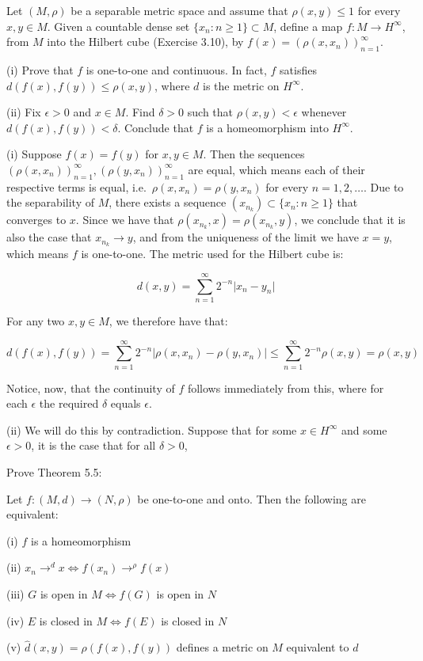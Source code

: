 \begin{exercise}{51}
    Let $(M, \rho)$ be a separable metric space and assume that $\rho(x, y) \leq 1$ for every $x, y \in M$.
    Given a countable dense set $\{x_n: n \geq 1\} \subset M$, define a map $f: M \rightarrow H^{\infty}$, from $M$ into the Hilbert cube (Exercise 3.10), by $f(x) = (\rho(x, x_n))_{n=1}^{\infty}$.

    (i) Prove that $f$ is one-to-one and continuous.
    In fact, $f$ satisfies $d(f(x), f(y)) \leq \rho(x, y)$, where $d$ is the metric on $H^{\infty}$.

    (ii) Fix $\epsilon > 0$ and $x \in M$.
    Find $\delta > 0$ such that $\rho(x, y) < \epsilon$ whenever $d(f(x), f(y)) < \delta$.
    Conclude that $f$ is a homeomorphism into $H^{\infty}$.
\end{exercise}

\begin{solution}
    
    (i) Suppose $f(x) = f(y)$ for $x, y \in M$.
    Then the sequences $(\rho(x, x_n))_{n=1}^{\infty}, (\rho(y, x_n))_{n=1}^{\infty}$ are equal, which means each of their respective terms is equal, i.e.\ $\rho(x, x_n) = \rho(y, x_n)$ for every $n = 1, 2, \ldots$.
    Due to the separability of $M$, there exists a sequence $(x_{n_k}) \subset \{x_n: n \geq 1\}$ that converges to $x$.
    Since we have that $\rho(x_{n_k}, x) = \rho(x_{n_k}, y)$, we conclude that it is also the case that $x_{n_k} \rightarrow y$, and from the uniqueness of the limit we have $x = y$, which means $f$ is one-to-one.
    The metric used for the Hilbert cube is:

    \[d(x, y) = \sum_{n=1}^{\infty}2^{-n} \lvert x_n - y_n \rvert\]

    For any two $x, y \in M$, we therefore have that:

    \[d(f(x), f(y)) = \sum_{n=1}^{\infty} 2^{-n} \lvert \rho(x, x_n) - \rho(y, x_n) \rvert \leq \sum_{n=1}^{\infty} 2^{-n} \rho(x, y) = \rho(x, y)\]

    Notice, now, that the continuity of $f$ follows immediately from this, where for each $\epsilon$ the required $\delta$ equals $\epsilon$.

    (ii) We will do this by contradiction.
    Suppose that for some $x \in H^{\infty}$ and some $\epsilon > 0$, it is the case that for all $\delta > 0$,
\end{solution}

\begin{exercise}{52}
    Prove Theorem 5.5:

    Let $f: (M, d) \rightarrow (N, \rho)$ be one-to-one and onto.
    Then the following are equivalent:

    (i) $f$ is a homeomorphism

    (ii) $x_n \rightarrow^{d} x \iff f(x_n) \rightarrow^{\rho} f(x)$ 

    (iii) $G$ is open in $M \iff f(G)$  is open in $N$

    (iv) $E$ is closed in $M \iff f(E)$ is closed in $N$

    (v) $\hat{d}(x, y) = \rho(f(x), f(y))$ defines a metric on $M$ equivalent to $d$
\end{exercise}

